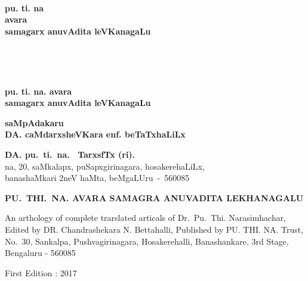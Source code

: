
\thispagestyle{empty}
~\phantom{a}
\vfill

\begin{center}
{\huge\bf pu. ti. na}\\[15pt]
{\huge\bf avara}\\[15pt]
{\huge\bf samagarx anuvAdita leVKanagaLu}
\end{center}

\vfill
\eject

\thispagestyle{empty}
~\phantom{a}
\vfill

\vfill
\eject

\thispagestyle{empty}
~\phantom{a}

\begin{center}
{\LARGE\bf pu. ti. na. avara}\\[5pt]
{\LARGE\bf samagarx anuvAdita leVKanagaLu}
\end{center}

\vfill

\begin{center}
{\bf saMpAdakaru}\\[5pt]
{\Large\bf DA. caMdarxsheVKara enf. beTaTxhaLiLx}
\end{center}

\vfill

\begin{center}
{\large\bf DA. pu.~ti.~na.~ TarxsfTx (ri).}\\[2pt]
na, 20, saMkalapx, puSapxgirinagara, hosakerehaLiLx,\\[2pt]
banashaMkari 2neV haMta, beMgaLUru~-~560085
\end{center}

\eject

\thispagestyle{empty}

\noindent
{\fontsize{8}{8pt}\selectfont\rm\bfseries PU.~THI.~NA. AVARA SAMAGRA ANUVADITA LEKHANAGALU}

\bigskip

\noindent
{\rm An arthology of complete trarslated articals of Dr.~Pu.~Thi. Narasimhachar, Edited by DR. Chandrashekara N. Bettahalli, Published by PU. THI. NA. Trust, No.~30, Sankalpa, Pushvagirinagara, Hosakerehalli, Banashankare, 3rd Stage, Bengaluru - 560085}

\vskip 1.2cm

\noindent
{\rm First Edition : 2017}

\vskip 1.2cm

